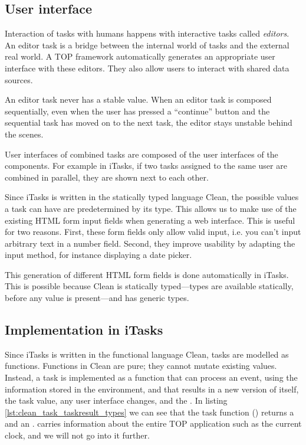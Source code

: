 \subsection{User interface}
Interaction of tasks with humans happens with interactive tasks called \textit{editors}. An editor task is a bridge between the internal world of tasks and the external real world.
A TOP framework automatically generates an appropriate user interface with these editors. They also allow users to interact with shared data sources.

An editor task never has a stable value. When an editor task is composed sequentially, even when the user has pressed a ``continue'' button and the sequential task has moved on to the next task, the editor stays unstable behind the scenes.

User interfaces of combined tasks are composed of the user interfaces of the components. For example in iTasks, if two tasks assigned to the same user are combined in parallel, they are shown next to each other. \cite[\S 4.2.4]{naus2020assisting}

Since iTasks is written in the statically typed language Clean, the possible values a task can have are predetermined by its type. This allows us to make use of the existing HTML form input fields when generating a web interface. This is useful for two reasons. First, these form fields only allow valid input, i.e. you can't input arbitrary text in a number field. Second, they improve usability by adapting the input method, for instance displaying a date picker.

This generation of different HTML form fields is done automatically in iTasks. This is possible because Clean is statically typed---types are available statically, before any value is present---and has generic types.

\subsection{Implementation in iTasks}
Since iTasks is written in the functional language Clean, tasks are modelled as functions. Functions in Clean are pure; they cannot mutate existing values. Instead, a task is implemented as a function that can process an event, using the information stored in the  environment, and that results in a new version of itself, the task value, any user interface changes, and the .
In listing \ref{lst:clean_task_taskresult_types} we can see that the task function () returns a  and an .  carries information about the entire TOP application such as the current clock, and we will not go into it further.

